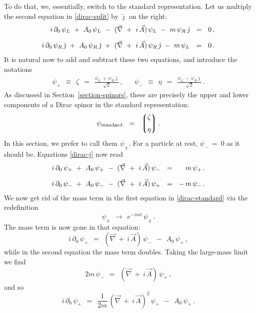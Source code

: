 \documentclass[epsfig,12pt]{article}
\newcommand{\p}{\partial}
\newcommand{\lgr}{\left\lgroup}
\newcommand{\rgr}{\right\rgroup}
\newcommand{\jj}{\hat\jmath}
\begin{document}
	To do that, we, essentially, switch to the standard representation.
	Let us multiply the second equation in \eqref{dirac-split} by $ \jj $
	on the right:
\begin{align}
%
\notag
	i\,\p_0\,\psi_L  ~+~  A_0\,\psi_L  ~-~  (\vec\nabla ~+~ i\,\vec A)\,\psi_L
	~-~  m\, \psi_R\, \jj	& ~~=~~	0\,,
	\\[2mm]
%
\label{dirac-j}
	i\,\p_0\,\psi_R\,\jj  ~+~  A_0\,\psi_R\,\jj  ~+~  (\vec\nabla ~+~ i\,\vec A)\,\psi_R\,\jj
	~-~  m\, \psi_L  & ~~=~~ 0\,.
\end{align}
	It is natural now to add and subtract these two equations, and introduce the notations
\begin{align}
	\psi_+		~~\equiv~~	\zeta	~~=~~	\frac{\psi_L \,+\, \psi_R \jj}{\sqrt{2}}\,,
	&&
	\psi_-		~~\equiv~~	\eta	~~=~~	\frac{\psi_L \,-\, \psi_R \jj}{\sqrt{2}}\,.
\end{align}
	As discussed in Section~\ref{section-spinors}, these are precisely the upper
	and lower components of a Dirac spinor in the standard representation:
\begin{equation}
	\psi_\text{standard}	~~=~~	
		\lgr 
			\begin{matrix}
				\zeta	\\[2mm]
				\eta
			\end{matrix}
		\rgr.
\end{equation}
	In this section, we prefer to call them $ \psi_\pm $.
	For a particle at rest, $ \psi_- ~=~ 0 $ as it should be.
	Equations \eqref{dirac-j} now read
\begin{align}
%
\notag
	i\,\p_0\,\psi_+  ~+~  A_0\, \psi_+  ~-~  (\vec\nabla ~+~  i\,\vec A)\, \psi_-	& ~~=~~  \phantom{+}\,m\,\psi_+\,.
	\\[2mm]
\label{dirac-standard}
	i\,\p_0\,\psi_-  ~+~  A_0\, \psi_-  ~-~  (\vec\nabla ~+~  i\,\vec A)\,\psi_+	& ~~=~~ -\,m\,\psi_-\,.
\end{align}
	We now get rid of the mass term in the first equation in \eqref{dirac-standard} via the redefinition
\[
	\psi_\pm	~~\to~~		e^{-i m t}\, \psi_\pm\,.
\]
	The mass term is now gone in that equation:
\begin{equation}
	i\,\p_0\,\psi_+		~~=~~	(\vec\nabla ~+~ i\,\vec A)\,\psi_-  ~~-~~  A_0\, \psi_+\,,
\end{equation}
	while in the second equation the mass term doubles.
	Taking the large-mass limit we find
\[
	2m\,\psi_-	~~=~~	(\vec\nabla ~+~ i\,\vec A)\,\psi_+\,,
\]
	and so
\begin{equation}
	i\,\p_0\,\psi_+		~~=~~
		\frac 1 {2m}\, (\vec\nabla ~+~ i\,\vec A)^2\, \psi_+  ~~-~~  A_0\, \psi_+\,.
\end{equation}
\end{document}
